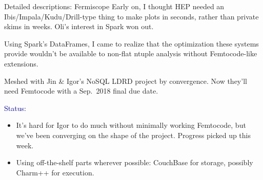 \begin{frame}{Detailed descriptions: Fermiscope}
\vspace{0.4 cm}
Early on, I thought HEP needed an Ibis/Impala/Kudu/Drill-type thing to make plots in seconds, rather than private skims in weeks. Oli's interest in Spark won out.

\vspace{0.3 cm}
Using Spark's DataFrames, I came to realize that the optimization these systems provide wouldn't be available to non-flat ntuple analysis without Femtocode-like extensions.

\vspace{0.3 cm}
Meshed with Jin \& Igor's NoSQL LDRD project by convergence. Now they'll need Femtocode with a Sep.\ 2018 final due date.

\vspace{0.4 cm}
\textcolor{darkblue}{Status:}
\begin{itemize}
\item It's hard for Igor to do much without minimally working Femtocode, but we've been converging on the shape of the project. Progress picked up this week.
\item Using off-the-shelf parts wherever possible: CouchBase for storage, possibly Charm++ for execution.
\end{itemize}
\end{frame}

